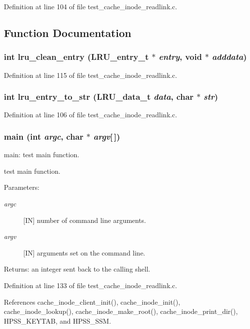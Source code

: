 Definition at line 104 of file test\_\-cache\_\-inode\_\-readlink.c.

\subsection{Function Documentation}
\subsubsection{\setlength{\rightskip}{0pt plus 5cm}int lru\_\-clean\_\-entry (LRU\_\-entry\_\-t $\ast$ {\em entry}, void $\ast$ {\em adddata})}\label{test__cache__inode__readlink_8c_a3}




Definition at line 115 of file test\_\-cache\_\-inode\_\-readlink.c.
\subsubsection{\setlength{\rightskip}{0pt plus 5cm}int lru\_\-entry\_\-to\_\-str (LRU\_\-data\_\-t {\em data}, char $\ast$ {\em str})}\label{test__cache__inode__readlink_8c_a2}




Definition at line 106 of file test\_\-cache\_\-inode\_\-readlink.c.
\subsubsection{\setlength{\rightskip}{0pt plus 5cm}main (int {\em argc}, char $\ast$ {\em argv}[$\,$])}\label{test__cache__inode__readlink_8c_a4}


main: test main function.

test main function.

\begin{Desc}
\item[Parameters:]
\begin{description}
\item[{\em argc}][IN] number of command line arguments. \item[{\em argv}][IN] arguments set on the command line.\end{description}
\end{Desc}
\begin{Desc}
\item[Returns:]an integer sent back to the calling shell. \end{Desc}


Definition at line 133 of file test\_\-cache\_\-inode\_\-readlink.c.

References cache\_\-inode\_\-client\_\-init(), cache\_\-inode\_\-init(), cache\_\-inode\_\-lookup(), cache\_\-inode\_\-make\_\-root(), cache\_\-inode\_\-print\_\-dir(), HPSS\_\-KEYTAB, and HPSS\_\-SSM.